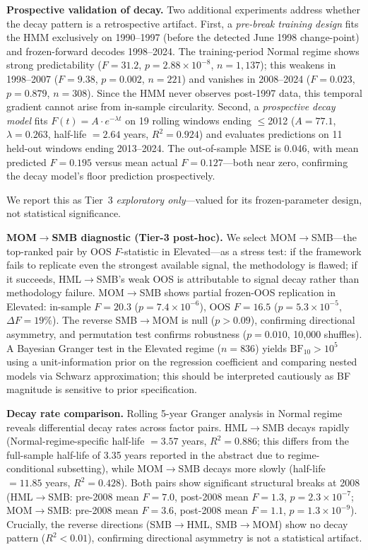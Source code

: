 \documentclass[sigconf,anonymous]{acmart}
\begin{document}
\textbf{Prospective validation of decay.}
Two additional experiments address whether the decay pattern is a
retrospective artifact.
First, a \emph{pre-break training design} fits the HMM exclusively on
1990--1997 (before the detected June 1998 change-point) and
frozen-forward decodes 1998--2024.
The training-period Normal regime shows strong predictability
($F = 31.2$, $p = 2.88 \times 10^{-8}$, $n = 1{,}137$); this weakens
in 1998--2007 ($F = 9.38$, $p = 0.002$, $n = 221$) and vanishes in
2008--2024 ($F = 0.023$, $p = 0.879$, $n = 308$). Since the HMM never
observes post-1997 data, this temporal gradient cannot arise from
in-sample circularity.
Second, a \emph{prospective decay model} fits
$F(t) = A \cdot e^{-\lambda t}$ on 19 rolling windows ending
$\leq$2012 ($A = 77.1$, $\lambda = 0.263$, half-life $= 2.64$ years,
$R^2 = 0.924$) and evaluates predictions on 11 held-out windows ending
2013--2024. The out-of-sample MSE is 0.046, with mean predicted
$F = 0.195$ versus mean actual $F = 0.127$---both near zero, confirming
the decay model's floor prediction prospectively.

We report this as Tier~3 \emph{exploratory only}---valued for its
frozen-parameter design, not statistical significance.


\textbf{MOM$\to$SMB diagnostic (Tier-3 post-hoc).}
We select MOM$\to$SMB---the top-ranked pair by OOS
$F$-statistic in Elevated---as a stress test: if the framework fails to replicate
even the strongest available signal, the methodology is flawed; if it
succeeds, HML$\to$SMB's weak OOS is attributable to signal decay rather
than methodology failure.
MOM$\to$SMB shows partial frozen-OOS replication in Elevated: in-sample
$F = 20.3$ ($p = 7.4 \times 10^{-6}$), OOS $F = 16.5$
($p = 5.3 \times 10^{-5}$, $\Delta F = 19\%$). The reverse SMB$\to$MOM is null ($p > 0.09$),
confirming directional asymmetry, and permutation test confirms
robustness ($p = 0.010$, 10{,}000 shuffles).
A Bayesian Granger test in the Elevated regime ($n = 836$) yields $\text{BF}_{10} > 10^5$
using a unit-information prior on the regression coefficient and comparing
nested models via Schwarz approximation; this should be interpreted cautiously
as BF magnitude is sensitive to prior specification.

\textbf{Decay rate comparison.}
Rolling 5-year Granger analysis in Normal regime reveals differential decay rates
across factor pairs. HML$\to$SMB decays rapidly (Normal-regime-specific half-life $= 3.57$ years, $R^2 = 0.886$;
this differs from the full-sample half-life of 3.35 years reported in the abstract
due to regime-conditional subsetting),
while MOM$\to$SMB decays more slowly (half-life $= 11.85$ years, $R^2 = 0.428$).
Both pairs show significant structural breaks at 2008 (HML$\to$SMB: pre-2008 mean $F = 7.0$,
post-2008 mean $F = 1.3$, $p = 2.3 \times 10^{-7}$; MOM$\to$SMB: pre-2008 mean $F = 3.6$,
post-2008 mean $F = 1.1$, $p = 1.3 \times 10^{-9}$).
Crucially, the reverse directions (SMB$\to$HML, SMB$\to$MOM) show no decay pattern
($R^2 < 0.01$), confirming directional asymmetry is not a statistical artifact.
\end{document}
